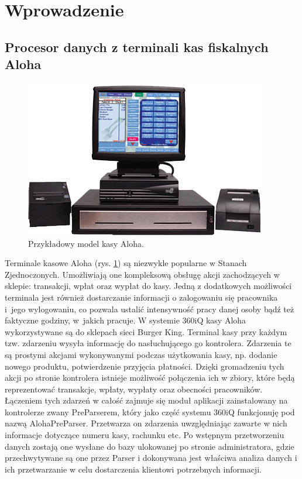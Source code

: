 \documentclass[a4paper]{book}
\begin{document}
\section{Wprowadzenie}
\subsection{Procesor danych z terminali kas fiskalnych Aloha}
\begin{figure}[t]
	\centering
	\includegraphics[width=\textwidth]{./img/aloha_pos.png}
	\caption{Przykładowy model kasy Aloha.}
	\label{fig:aloha_pos}
\end{figure}
Terminale kasowe Aloha (rys. \ref{fig:aloha_pos}) są niezwykle popularne w Stanach Zjednoczonych. Umożliwiają one kompleksową obsługę akcji zachodzących w sklepie: transakcji, wpłat oraz wypłat do kasy. Jedną z dodatkowych możliwości terminala jest również dostarczanie informacji o zalogowaniu się pracownika i~jego wylogowaniu, co pozwala ustalić intensywność pracy danej osoby bądź też faktyczne godziny, w~jakich pracuje. W systemie 360iQ kasy Aloha wykorzystywane są do sklepach sieci Burger King. Terminal kasy przy każdym tzw. zdarzeniu wysyła informację do nasłuchującego go kontrolera. Zdarzenia te są prostymi akcjami wykonywanymi podczas użytkowania kasy, np. dodanie nowego produktu, potwierdzenie przyjęcia płatności. Dzięki gromadzeniu tych akcji po stronie kontrolera istnieje możliwość połączenia ich w zbiory, które będą reprezentować transakcje, wpłaty, wypłaty oraz obecności pracowników. Łączeniem tych zdarzeń w całość zajmuje się moduł aplikacji zainstalowany na kontrolerze zwany PreParserem, który jako część systemu 360iQ funkcjonuję pod nazwą AlohaPreParser. Przetwarza on zdarzenia uwzględniając zawarte w nich informacje dotyczące numeru kasy, rachunku etc.
Po wstępnym przetworzeniu danych zostają one wysłane do bazy ulokowanej po stronie administratora, gdzie przechwytywane są one przez Parser i dokonywana jest właściwa analiza danych i ich przetwarzanie w celu dostarczenia klientowi potrzebnych informacji. 
\newpage
\end{document}
